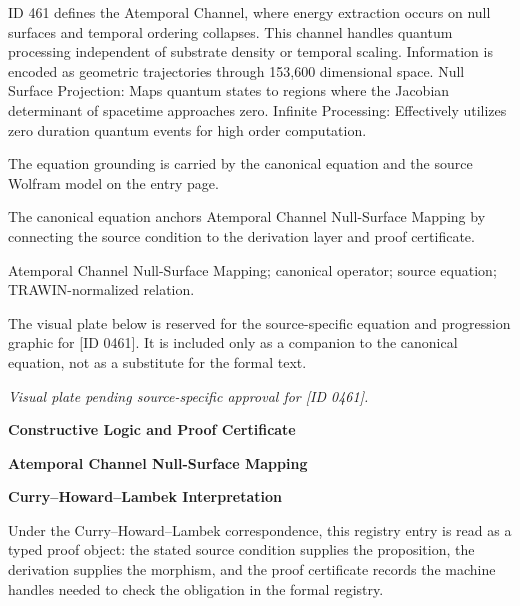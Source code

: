 ID 461 defines the Atemporal Channel, where energy extraction occurs on null surfaces and temporal ordering collapses. This channel handles quantum processing independent of substrate density or temporal scaling. Information is encoded as geometric trajectories through 153,600 dimensional space. Null Surface Projection: Maps quantum states to regions where the Jacobian determinant of spacetime approaches zero. Infinite Processing: Effectively utilizes zero duration quantum events for high order computation.

The equation grounding is carried by the canonical equation and the source Wolfram model on the entry page.

The canonical equation anchors Atemporal Channel Null-Surface Mapping by connecting the source condition to the derivation layer and proof certificate.

Atemporal Channel Null-Surface Mapping; canonical operator; source equation; TRAWIN-normalized relation.
\endgroup

\begingroup\footnotesize\sloppy
The visual plate below is reserved for the source-specific equation and progression graphic for [ID 0461]. It is included only as a companion to the canonical equation, not as a substitute for the formal text.
\par\endgroup
\begingroup\footnotesize\itshape
Visual plate pending source-specific approval for [ID 0461].
\par\endgroup

\clearpage
\begingroup\tzpsupportsetup
\noindent\textbf{\fontsize{10.8pt}{12.8pt}\selectfont [ID 0461] Constructive Logic and Proof Certificate}\par
\noindent\textbf{\fontsize{10pt}{12pt}\selectfont Atemporal Channel Null-Surface Mapping}\par
\vspace{0.45em}
\begingroup
\footnotesize
\setlength{\parskip}{0.22em}
\setlength{\parindent}{0pt}
\noindent\textbf{Curry--Howard--Lambek Interpretation}\par
Under the Curry--Howard--Lambek correspondence, this registry entry is read as a typed proof
object: the stated source condition supplies the proposition, the derivation supplies the
morphism, and the proof certificate records the machine handles needed to check the obligation
in the formal registry.


